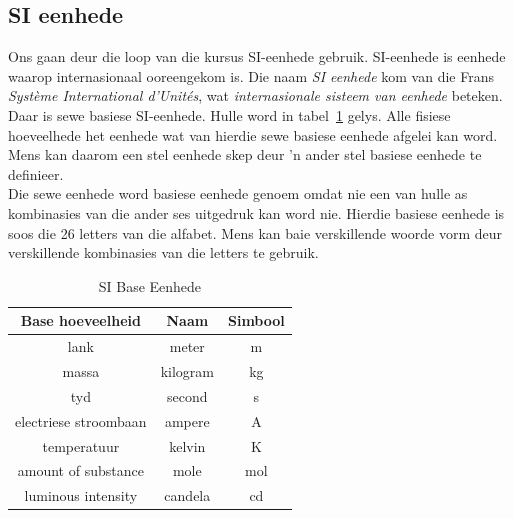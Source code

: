 \subsection*{SI eenhede}
            \nopagebreak
Ons gaan deur die loop van die kursus SI-eenhede gebruik. SI-eenhede is eenhede waarop internasionaal ooreengekom is.
  {Die naam \textsl{SI eenhede} kom van die Frans \textsl{Syst\`{e}me International d'Unit\'{e}s}, wat \textsl{internasionale sisteem van eenhede} beteken.  } 
Daar is sewe basiese SI-eenhede. Hulle word in tabel~\ref{tab:units:SIunits} gelys. Alle fisiese hoeveelhede het eenhede wat van hierdie sewe basiese eenhede afgelei kan word. Mens kan daarom een stel eenhede skep deur  'n ander stel basiese eenhede te definieer. \\
Die sewe eenhede word basiese eenhede genoem omdat nie een van hulle as kombinasies van die ander ses uitgedruk kan word nie. Hierdie basiese eenhede is soos die 26 letters van die alfabet. Mens kan baie verskillende woorde vorm deur verskillende kombinasies van die letters te gebruik.\par 
\begin{table}[H]
\centering
\begin{tabular}{|c|c|c|}\hline
\textbf{Base hoeveelheid} & \textbf{Naam} & \textbf{Simbool} \\
\hline lank & meter & m\\ \hline 
massa & kilogram & kg\\ \hline 
tyd & second & s\\ \hline 
electriese stroombaan & ampere& A\\ \hline 
temperatuur & kelvin & K\\ \hline 
amount of substance & mole & mol\\ \hline 
luminous intensity & candela & cd\\ \hline
\end{tabular}
\caption{SI Base Eenhede}\label{tab:units:SIunits}
\end{table}
